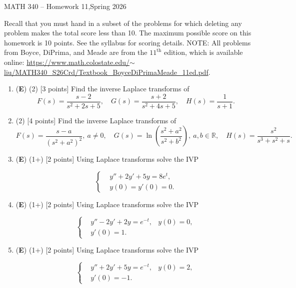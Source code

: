 \documentclass[12pt]{article}
\begin{document}
\begin{center}
   {\Large MATH 340 -- Homework 11,\quad Spring 2026}
\end{center}

Recall that you must hand in a subset of the problems for which deleting any problem makes the total score less than 10. The maximum possible score on this homework is 10 points. See the syllabus for scoring details. NOTE: All problems from Boyce, DiPrima, and Meade are from the \(11^{\text{th}}\) edition, which is available online: \href{https://www.math.colostate.edu/~liu/MATH340_S26Crd/Textbook_BoyceDiPrimaMeade_11ed.pdf}{https://www.math.colostate.edu/\(\sim\)liu/MATH340\_S26Crd/Textbook\_BoyceDiPrimaMeade\_11ed.pdf}.

\begin{enumerate}
   \item (\textbf{E}) (2) [3 points] Find the inverse Laplace transforms of 
   \[
   F(s)=\frac{s-2}{s^2+2s+5},\quad G(s)=\frac{s+2}{s^2+4s+5},\quad H(s)=\frac{1}{s+1}.
   \]

   \item (2) [4 points] Find the inverse Laplace transforms of 
   \[
   F(s)=\frac{s-a}{(s^2+a^2)^2},\  a\neq 0,\quad G(s)=\ln\left(\frac{s^2+a^2}{s^2+b^2}\right),\ a,b\in\mathbb R,\quad H(s)=\frac{s^2}{s^3+s^2+s}.
   \]

   \item (\textbf{E}) (1+) [2 points] Using Laplace transforms solve the IVP
   
   \[
   \left\lbrace
   \begin{aligned}
      &y''+2y'+5y=8e^t,\\
      &y(0)=y'(0)=0.
   \end{aligned}
   \right.
   \]

   \item (\textbf{E}) (1+) [2 points] Using Laplace transforms solve the IVP
   
   \[
   \left\lbrace
   \begin{aligned}
      &y''-2y'+2y=e^{-t},
      &y(0)=0,\\
      &y'(0)=1.
   \end{aligned}
   \right.
   \]

   \item (\textbf{E}) (1+) [2 points] Using Laplace transforms solve the IVP
   
   \[
   \left\lbrace
   \begin{aligned}
      &y''+2y'+5y=e^{-t},
      &y(0)=2,\\
      &y'(0)=-1.
   \end{aligned}
   \right.
   \]


\end{enumerate}
\end{document}
